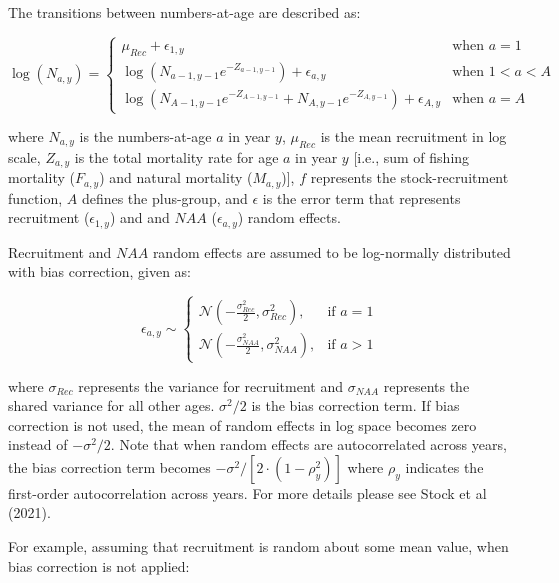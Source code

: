 \documentclass[
  12pt,
]{article}
\begin{document}
The transitions between numbers-at-age are described as:

\begin{equation}
\log(N_{a,y}) =
\begin{cases}
\mu_{Rec} + \epsilon_{1,y} & \text{when } a = 1 \\
\log(N_{a-1, y-1} e^{-Z_{a-1, y-1}}) + \epsilon_{a,y} & \text{when } 1 < a < A \\
\log(N_{A-1, y-1} e^{-Z_{A-1, y-1}} + N_{A, y-1} e^{-Z_{A, y-1}}) + \epsilon_{A,y} & \text{when } a = A
\end{cases}
\end{equation}

where \(N_{a,y}\) is the numbers-at-age \(a\) in year \(y\),
\(\mu_{Rec}\) is the mean recruitment in log scale, \(Z_{a,y}\) is the
total mortality rate for age \(a\) in year \(y\) {[}i.e., sum of fishing
mortality (\(F_{a,y}\)) and natural mortality (\(M_{a,y}\)){]}, \(f\)
represents the stock-recruitment function, \(A\) defines the plus-group,
and \(\epsilon\) is the error term that represents recruitment
(\(\epsilon_{1,y}\)) and and \(NAA\) (\(\epsilon_{a,y}\)) random
effects.

Recruitment and \(NAA\) random effects are assumed to be log-normally
distributed with bias correction, given as:

\begin{equation}
\epsilon_{a,y} \sim 
\begin{cases} 
\mathcal{N}\left(-\frac{\sigma_{Rec}^2}{2}, \sigma_{Rec}^2\right), & \text{if } a = 1 \\
\mathcal{N}\left(-\frac{\sigma_{NAA}^2}{2}, \sigma_{NAA}^2\right), & \text{if } a > 1
\end{cases}
\end{equation}

where \(\sigma_{Rec}\) represents the variance for recruitment and
\(\sigma_{NAA}\) represents the shared variance for all other ages.
\(\sigma^2/2\) is the bias correction term. If bias correction is not
used, the mean of random effects in log space becomes zero instead of
\(-\sigma^2/2\). Note that when random effects are autocorrelated across
years, the bias correction term becomes
\(-\sigma^2 / [2 \cdot (1 - \rho_y^2)]\) where \(\rho_{y}\) indicates
the first-order autocorrelation across years. For more details please
see Stock et al (2021).

For example, assuming that recruitment is random about some mean value,
when bias correction is not applied:
\end{document}
